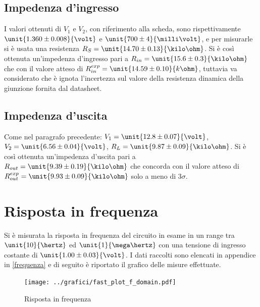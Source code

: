 \documentclass[10pt,a4paper]{article}
\begin{document}
\subsection{Impedenza d'ingresso}
I valori ottenuti di $V_1$ e $V_2$, con riferimento alla scheda, sono rispettivamente $\unit{1.360 \pm 0.008}{\volt}$ e $\unit{700 \pm 4}{\milli\volt}$, e per misurarle si è usata una resistenza $R_S = \unit{14.70 \pm 0.13}{\kilo\ohm}$.
Si è così ottenuta un'impedenza d'ingresso pari a $R_{in} = \unit{15.6 \pm 0.3}{\kilo\ohm}$ che   con il valore atteso di $R^{exp}_{in} = \unit{14.59 \pm 0.10}{k\ohm}$, tuttavia va considerato che è ignota l'incertezza sul valore della resistenza dinamica della giunzione fornita dal datasheet.

\subsection{Impedenza d'uscita}
Come nel paragrafo precedente: $V_1 = \unit{12.8 \pm 0.07}{\volt}$, $V_2 = \unit{6.56 \pm 0.04}{\volt}$, $R_L = \unit{9.87 \pm 0.09}{\kilo\ohm}$.
Si è così ottenuta un'impedenza d'uscita pari a $R_{out} = \unit{9.39 \pm 0.19}{\kilo\ohm}$ che concorda con il valore atteso di $R_{out}^{exp} = \unit{9.93 \pm 0.09}{\kilo\ohm}$ solo a meno di $3\sigma$.

\section{Risposta in frequenza}

Si è misurata la risposta in frequenza del circuito in esame in un range tra $\unit{10}{\hertz}$ ed $\unit{1}{\mega\hertz}$ con una tensione di ingresso costante di $\unit{1.00 \pm 0.03}{\volt}$. I dati raccolti sono elencati in appendice in \tablename{\ref{frequenza}} e di seguito è riportato il grafico delle misure effettuate.

\begin{figure}[h!]
	\centering
		\texttt{[image: ../grafici/fast\_plot\_f\_domain.pdf]}
		\caption{Risposta in frequenza}
		\label{early}
\end{figure}
\end{document}
